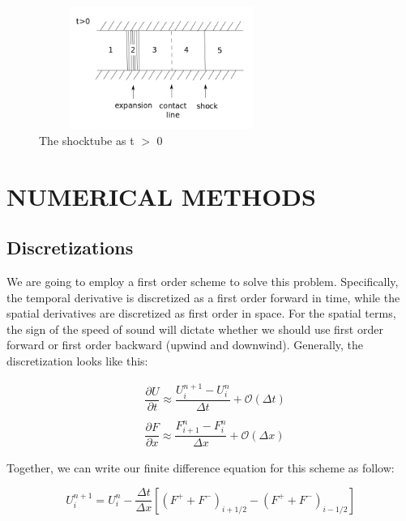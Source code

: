 \documentclass[12pt]{article}
\begin{document}
    \begin{figure}[H]
        \begin{center}
        \includegraphics[height = 40mm,width = 80mm]{solution_sod.png}
        \caption{The shocktube as t $>$ 0}
        \end{center}
    \end{figure}  

    \newpage
    \section{NUMERICAL METHODS}

    \subsection{Discretizations}
    We are going to employ a first order scheme to solve this problem. Specifically, the temporal derivative is discretized as a first order forward in time, while the spatial derivatives are discretized as first order in space.  For the spatial terms, the sign of the speed of sound will dictate whether we should use first order forward or first order backward (upwind and downwind).  Generally, the discretization looks like this: 

    \begin{equation}
        \begin{aligned}
            &\dfrac{\partial U}{\partial t} \approx \dfrac{U^{n+1}_i-U^n_i}{\Delta t} + \mathcal{O}(\Delta t)\\ \\
            &\dfrac{\partial F}{\partial x} \approx \dfrac{F^{n}_{i+1}-F^n_i}{\Delta x} + \mathcal{O}(\Delta x)
        \end{aligned}        
    \end{equation}

    \noindent
    Together, we can write our finite difference equation for this scheme as follow: 

    \begin{equation}
        U^{n+1}_{i} = U_i^n-\dfrac{\Delta t}{\Delta x}\left[(F^+ + F^-)_{i+1/2}-(F^+ + F^-)_{i-1/2}\right]
    \end{equation}
\end{document}
